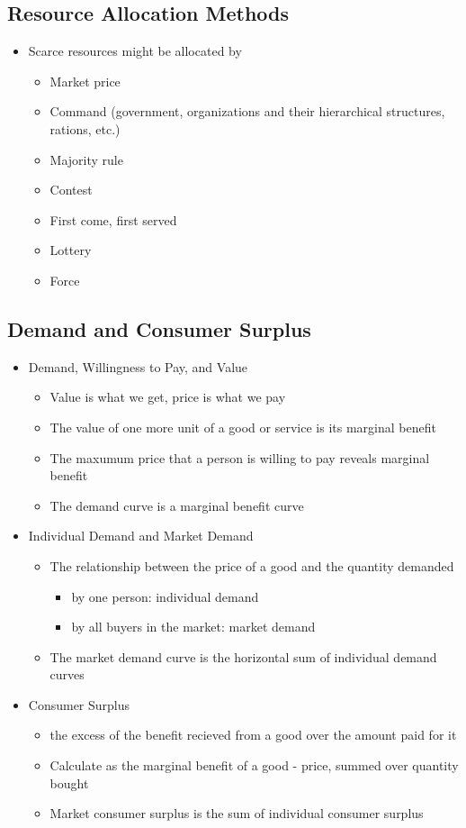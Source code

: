 \documentclass[11pt]{article}
\begin{document}
\subsection{Resource Allocation Methods}
\label{sec:org192254a}
\begin{itemize}
\item Scarce resources might be allocated by
\begin{itemize}
\item Market price
\item Command (government, organizations and their hierarchical structures, rations, etc.)
\item Majority rule
\item Contest
\item First come, first served
\item Lottery
\item Force
\end{itemize}
\end{itemize}
\subsection{Demand and Consumer Surplus}
\label{sec:org2f2b4e5}
\begin{itemize}
\item Demand, Willingness to Pay, and Value
\begin{itemize}
\item Value is what we get, price is what we pay
\item The value of one more unit of a good or service is its marginal benefit
\item The maxumum price that a person is willing to pay reveals marginal benefit
\item The demand curve is a marginal benefit curve
\end{itemize}
\item Individual Demand and Market Demand
\begin{itemize}
\item The relationship between the price of a good and the quantity demanded
\begin{itemize}
\item by one person: individual demand
\item by all buyers in the market: market demand
\end{itemize}
\item The market demand curve is the horizontal sum of individual demand curves
\end{itemize}
\item Consumer Surplus
\begin{itemize}
\item the excess of the benefit recieved from a good over the amount paid for it
\item Calculate as the marginal benefit of a good - price, summed over quantity bought
\item Market consumer surplus is the sum of individual consumer surplus
\end{itemize}
\end{itemize}
\end{document}
